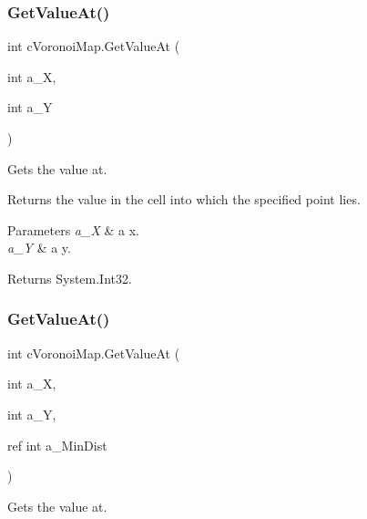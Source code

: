 \subsubsection{\texorpdfstring{Get\+Value\+At()}{GetValueAt()}\hspace{0.1cm}{\footnotesize\ttfamily [1/3]}}
{\footnotesize\ttfamily int c\+Voronoi\+Map.\+Get\+Value\+At (\begin{DoxyParamCaption}\item[{int}]{a\+\_\+X,  }\item[{int}]{a\+\_\+Y }\end{DoxyParamCaption})\hspace{0.3cm}{\ttfamily [inline]}}



Gets the value at. 

Returns the value in the cell into which the specified point lies. 
\begin{DoxyParams}{Parameters}
{\em a\+\_\+X} & a x.\\
\hline
{\em a\+\_\+Y} & a y.\\
\hline
\end{DoxyParams}
\begin{DoxyReturn}{Returns}
System.\+Int32.
\end{DoxyReturn}
\mbox{\label{classc_voronoi_map_ae9b7f43fdbdefbcc6345ffcd93972575}} 
\subsubsection{\texorpdfstring{Get\+Value\+At()}{GetValueAt()}\hspace{0.1cm}{\footnotesize\ttfamily [2/3]}}
{\footnotesize\ttfamily int c\+Voronoi\+Map.\+Get\+Value\+At (\begin{DoxyParamCaption}\item[{int}]{a\+\_\+X,  }\item[{int}]{a\+\_\+Y,  }\item[{ref int}]{a\+\_\+\+Min\+Dist }\end{DoxyParamCaption})\hspace{0.3cm}{\ttfamily [inline]}}



Gets the value at. 

